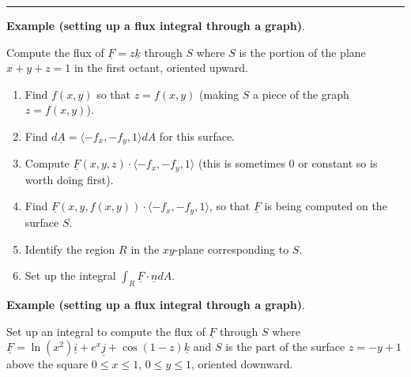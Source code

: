 \documentclass[12pt,letterpaper,noanswers]{exam}
\newcommand{\mb}[1]{\underline{#1}}
\begin{document}
\vspace{0.2cm}
\hrule
\vspace{0.2cm}
\noindent\textbf{Example (setting up a flux integral through a graph)}.

Compute the flux of $\mb F = z\mb k$ through $S$ where $S$ is the portion of the plane $x+y+z=1$ in the first octant, oriented upward.

\begin{enumerate}
\itemsep3em
    \item Find $f(x,y)$ so that $z = f(x,y)$ (making $S$ a piece of the graph $z = f(x,y)$).  %
    \item Find $d\mb A = \langle -f_x, -f_y, 1\rangle dA$ for this surface. %
    \item Compute $\mb F(x,y,z)\cdot \langle -f_x, -f_y, 1\rangle$ (this is sometimes $0$ or constant so is worth doing first).  %
    \item Find $\mb F(x,y,f(x,y))\cdot \langle -f_x, -f_y, 1\rangle$, so that $\mb F$ is being computed on the surface $S$. %
    \item Identify the region $R$ in the $xy$-plane corresponding to $S$.  %
    \item Set up the integral $\displaystyle \int_R \mb F\cdot \mb n dA$.  %
    \vspace{1in}
\end{enumerate}

\noindent\textbf{Example (setting up a flux integral through a graph)}.

Set up an integral to compute the flux of $\mb F$ through $S$ where $\mb F = \ln(x^2)\mb i + e^x\mb j + \cos(1-z)\mb k$ and $S$ is the part of the surface $z = -y+1$ above the square $0\leq x\leq 1$, $0\leq y\leq 1$, oriented downward.

\vspace{2in}
\end{document}
